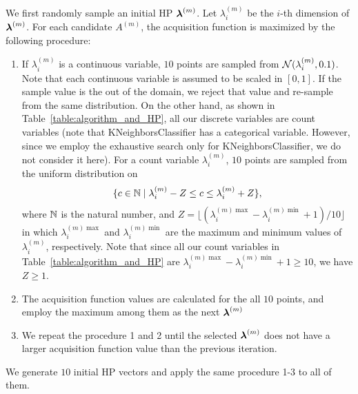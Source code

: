 We first randomly sample an initial HP $\boldsymbol{\lambda}^{(m)}$.
%
Let $\lambda^{(m)}_i$ be the $i$-th dimension of $\boldsymbol{\lambda}^{(m)}$.
%
For each candidate $A^{(m)}$, the acquisition function is maximized by the following procedure:
\begin{enumerate}
 \item If $\lambda^{(m)}_i$ is a continuous variable, $10$ points are sampled from ${\mathcal N}(\lambda^{(m)}_i, 0.1)$.
%
Note that each continuous variable is assumed to be scaled in $[0,1]$.
%
If the sample value is the out of the domain, we reject that value and re-sample from the same distribution.
%
On the other hand, as shown in Table~\ref{table:algorithm_and_HP}, all our discrete variables are count variables (note that KNeighborsClassifier has a categorical variable. However, since we employ the exhaustive search only for KNeighborsClassifier, we do not consider it here). 
%
For a count variable $\lambda^{(m)}_i$, $10$ points are sampled from the uniform distribution on 
\begin{align*}
 \{ c \in \mathbb{N}
 \mid 
 \lambda^{(m)}_i - Z
 \leq c \leq
 \lambda^{(m)}_i + Z
 \},
\end{align*}
where 
$\mathbb{N}$
is the natural number, and
$Z = \lfloor (\lambda_i^{(m) \max} - \lambda_i^{(m) \min} + 1)/10 \rfloor$
in which 
$\lambda_i^{(m) \max}$ 
and 
$\lambda_i^{(m) \min}$
are the maximum and minimum values of 
$\lambda_i^{(m)}$, 
respectively.
%
Note that since all our count variables in Table~\ref{table:algorithm_and_HP} are
$\lambda_i^{(m) \max} - \lambda_i^{(m) \min} + 1 \geq 10$, 
we have $Z \geq 1$.

 \item The acquisition function values are calculated for the all $10$ points, and employ the maximum among them as the next $\boldsymbol{\lambda}^{(m)}$

 \item We repeat the procedure 1 and 2 until the selected $\boldsymbol{\lambda}^{(m)}$ does not have a larger acquisition function value than the previous iteration.
\end{enumerate}
%
We generate $10$ initial HP vectors and apply the same procedure 1-3 to all of them.




